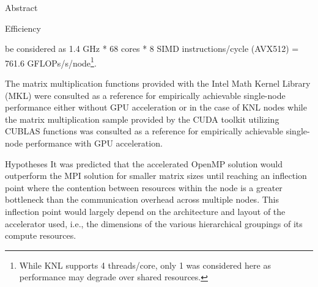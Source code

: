 \documentclass{article}
\begin{document}
\begin{section}{Abstract}
\begin{subsection}{Efficiency}
\begin{paragraph}{}
      be considered as 1.4 GHz * 68 cores * 8 SIMD instructions/cycle (AVX512) = 761.6 GFLOPs/s/node\autocite{Stampede2UserGuide}\footnote{While KNL supports 4 threads/core, only 1 was considered here as performance may degrade over shared resources.}.
    \end{paragraph}
    \begin{paragraph}{}
      The matrix multiplication functions provided with the Intel Math Kernel Library (MKL) were consulted as a reference for empirically
      achievable single-node performance either without GPU acceleration or in the case of KNL nodes while the matrix multiplication sample provided
      by the CUDA toolkit utilizing CUBLAS functions was consulted as a reference for empirically achievable single-node performance
      with GPU acceleration.
    \end{paragraph}
  \end{subsection}
  \begin{subsection}{Hypotheses}
    It was predicted that the accelerated OpenMP solution would outperform the MPI solution for smaller matrix sizes until
    reaching an inflection point where the contention between resources within the node is a greater bottleneck than
    the communication overhead across multiple nodes. This inflection point would largely depend on the architecture
    and layout of the accelerator used, i.e., the dimensions of the various hierarchical groupings of its compute resources.
  \end{subsection}
\end{section}
\end{document}
